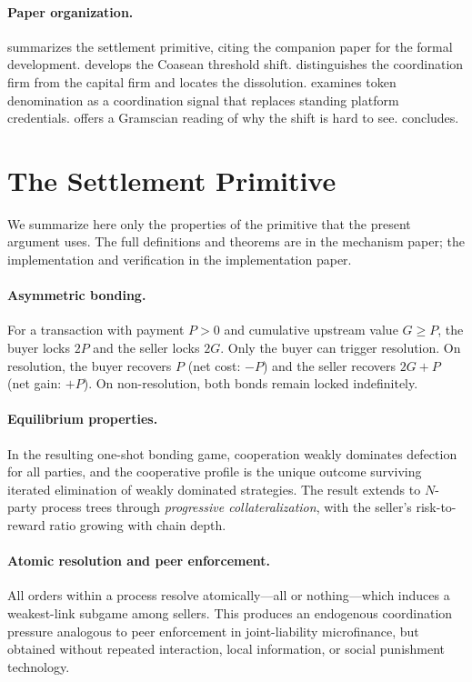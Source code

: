 \documentclass[11pt,a4paper]{article}
\theoremstyle{definition}
\theoremstyle{remark}
\newcommand{\pay}{P}
\newcommand{\cumval}{G}
\begin{document}
\paragraph{Paper organization.}
 summarizes the settlement primitive, citing the
companion paper for the formal development.
 develops the Coasean threshold shift.
 distinguishes the coordination firm from the
capital firm and locates the dissolution.
 examines token denomination as a coordination signal
that replaces standing platform credentials.
 offers a Gramscian reading of why the shift is
hard to see.
 concludes.

\section{The Settlement Primitive}
\label{sec:primitive}

We summarize here only the properties of the primitive that the
present argument uses. The full definitions and theorems are
in the mechanism paper; the implementation and verification
in the implementation paper.

\paragraph{Asymmetric bonding.}
For a transaction with payment $\pay > 0$ and cumulative upstream
value $\cumval \geq \pay$, the buyer locks $2\pay$ and the seller
locks $2\cumval$. Only the buyer can trigger resolution. On
resolution, the buyer recovers $\pay$ (net cost: $-\pay$) and the
seller recovers $2\cumval + \pay$ (net gain: $+\pay$). On
non-resolution, both bonds remain locked indefinitely.

\paragraph{Equilibrium properties.}
In the resulting one-shot bonding game, cooperation weakly dominates
defection for all parties, and the cooperative profile is the unique
outcome surviving iterated elimination of weakly dominated
strategies. The result extends to $N$-party process trees through
\emph{progressive collateralization}, with the seller's
risk-to-reward ratio growing with chain depth.

\paragraph{Atomic resolution and peer enforcement.}
All orders within a process resolve atomically---all or nothing---which
induces a weakest-link subgame among sellers. This produces an
endogenous coordination pressure analogous to peer enforcement in
joint-liability microfinance, but obtained without repeated
interaction, local information, or social punishment technology.
\end{document}
